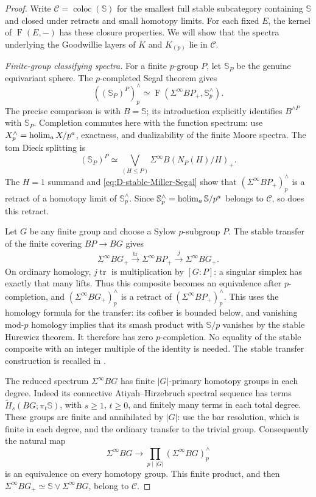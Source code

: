 \begin{proof}
Write $\mathcal C=\operatorname{coloc}(\mathbb S)$ for the smallest full
stable subcategory containing $\mathbb S$ and closed under retracts and
small homotopy limits. For each fixed $E$, the kernel of
$\operatorname{F}(E,-)$ has these closure properties. We will show that
the spectra underlying the Goodwillie layers of $K$ and $K_{(p)}$ lie
in $\mathcal C$.

\emph{Finite-group classifying spectra.}
For a finite $p$-group $P$, let $\mathbb S_P$ be the genuine equivariant
sphere. The $p$-completed Segal theorem gives
\begin{equation}\label{eq:D-stable-Miller-Segal}
 ((\mathbb S_P)^P)^{\wedge}_p
 \simeq \operatorname{F}(\Sigma^\infty BP_+,\mathbb S^{\wedge}_p).
\end{equation}
The precise comparison is \cite[Theorem~1.1]{FGHBergsakerRognes2023}
with $B=\mathbb S$; its introduction explicitly identifies $B^{\wedge P}$
with $\mathbb S_P$. Completion commutes here with the function spectrum:
use $X^{\wedge}_p=\operatorname*{holim}_a X/p^a$, exactness, and dualizability of the
finite Moore spectra. The tom Dieck splitting
\cite[Corollary~2.3 and Section~3]{FGHCarlsson1992} is
\[
 (\mathbb S_P)^P\simeq
 \bigvee_{(H\leq P)}\Sigma^\infty B(N_P(H)/H)_+.
\]
The $H=1$ summand and \eqref{eq:D-stable-Miller-Segal} show that
$(\Sigma^\infty BP_+)^{\wedge}_p$ is a retract of a homotopy limit of
$\mathbb S^{\wedge}_p$. Since
$\mathbb S^{\wedge}_p=\operatorname*{holim}_a\mathbb S/p^a$ belongs to $\mathcal C$,
so does this retract.

Let $G$ be any finite group and choose a Sylow $p$-subgroup $P$.
The stable transfer of the finite covering $BP\to BG$ gives
\[
 \Sigma^\infty BG_+\xrightarrow{\operatorname{tr}}
 \Sigma^\infty BP_+\xrightarrow{j}\Sigma^\infty BG_+.
\]
On ordinary homology, $j\operatorname{tr}$ is multiplication by
$[G:P]$: a singular simplex has exactly that many lifts. Thus this
composite becomes an equivalence after $p$-completion, and
$(\Sigma^\infty BG_+)^{\wedge}_p$ is a retract of
$(\Sigma^\infty BP_+)^{\wedge}_p$. This uses the homology formula for
the transfer: its cofiber is bounded below, and vanishing mod-$p$
homology implies that its smash product with $\mathbb S/p$ vanishes
by the stable Hurewicz theorem. It therefore has zero $p$-completion.
No equality of the stable composite with an integer multiple of the
identity is needed. The stable transfer construction is recalled
in \cite[Section~2(B)]{FGHCarlsson1992}.

The reduced spectrum $\Sigma^\infty BG$ has finite
$|G|$-primary homotopy groups in each degree. Indeed its connective
Atiyah--Hirzebruch spectral sequence has terms
$\widetilde H_s(BG;\pi_t\mathbb S)$, with $s\geq1$, $t\geq0$,
and finitely many terms in each total degree. These groups are finite
and annihilated by $|G|$: use the bar resolution, which is finite in
each degree, and the ordinary transfer to the trivial group.
Consequently the natural map
\[
 \Sigma^\infty BG\longrightarrow
 \prod_{p\mid |G|}(\Sigma^\infty BG)^{\wedge}_p
\]
is an equivalence on every homotopy group. This finite product, and
then $\Sigma^\infty BG_+\simeq\mathbb S\vee\Sigma^\infty BG$, belong
to $\mathcal C$.


\end{proof}
